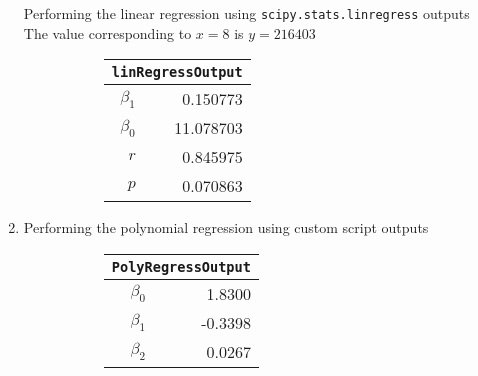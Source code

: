 \begin{enumerate}
Performing the linear regression using \texttt{scipy.stats.linregress} outputs \\
The value corresponding to $ x = 8 $ is $ y = 216403 $\\

\begin{figure}[H]
	\begin{subfigure}[]{0.2\linewidth}
		\centering
		\begin{tabular}{@{}rr@{}}
			\toprule
			\multicolumn{2}{c}{\texttt{linRegressOutput}} \\
			\midrule
			$\beta_1$     &         0.150773 \\
			$\beta_0$ &        11.078703 \\
			$r$    &         0.845975 \\
			$p$    &         0.070863 \\
			\bottomrule
		\end{tabular}
		
	\end{subfigure}
	\begin{subfigure}[]{0.8\linewidth}
		\centering
		
	\end{subfigure}
\end{figure}

\item Performing the polynomial regression using custom script outputs \\


\begin{figure}[H]
	\begin{subfigure}[]{0.2\linewidth}
		\centering
		\begin{tabular}{@{}rr@{}}
			\toprule
			\multicolumn{2}{c}{\texttt{PolyRegressOutput}} \\
			\midrule
			$\beta_0$ &           1.8300 \\
			$\beta_1$ &          -0.3398 \\
			$\beta_2$ &           0.0267 \\
			\bottomrule
		\end{tabular}
		

\end{subfigure}
\end{figure}
\end{enumerate}
